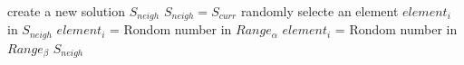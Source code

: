 \setlength{\textfloatsep}{0.2cm}
\begin{algorithm2e}[t]
	create a new solution $S_{neigh}$\;
	{
		$S_{neigh}=S_{curr}$\;
		randomly selecte an element $element_{i}$ in $S_{neigh}$\;
		{
			$element_{i}$ = Rondom number in $Range_{\alpha}$\;
		}
		{
			$element_{i}$ = Rondom number in $Range_{\beta}$\;
		}
	}
	\Return $S_{neigh}$ \;
	\caption{$Neighbor()$}
	\label{algo:neighbor_1}
\end{algorithm2e}
\setlength{\textfloatsep}{0.2cm}